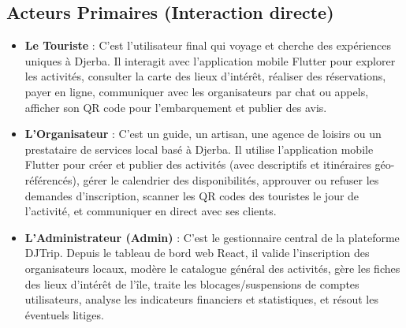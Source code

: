 \documentclass[12pt,a4paper]{report}
\begin{document}
\subsection{Acteurs Primaires (Interaction directe)}
\begin{itemize}[label=\textbullet]
    \item \textbf{Le Touriste} :
    C'est l'utilisateur final qui voyage et cherche des expériences uniques à Djerba. Il interagit avec l'application mobile Flutter pour explorer les activités, consulter la carte des lieux d'intérêt, réaliser des réservations, payer en ligne, communiquer avec les organisateurs par chat ou appels, afficher son QR code pour l'embarquement et publier des avis.

    \item \textbf{L’Organisateur} :
    C'est un guide, un artisan, une agence de loisirs ou un prestataire de services local basé à Djerba. Il utilise l'application mobile Flutter pour créer et publier des activités (avec descriptifs et itinéraires géo-référencés), gérer le calendrier des disponibilités, approuver ou refuser les demandes d'inscription, scanner les QR codes des touristes le jour de l'activité, et communiquer en direct avec ses clients.

    \item \textbf{L’Administrateur (Admin)} :
    C'est le gestionnaire central de la plateforme DJTrip. Depuis le tableau de bord web React, il valide l'inscription des organisateurs locaux, modère le catalogue général des activités, gère les fiches des lieux d'intérêt de l'île, traite les blocages/suspensions de comptes utilisateurs, analyse les indicateurs financiers et statistiques, et résout les éventuels litiges.
\end{itemize}
\end{document}
